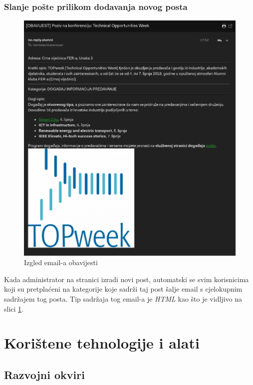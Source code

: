 \documentclass[zavrsni, numeric]{fer}
\begin{document}
\subsection{Slanje pošte prilikom dodavanja novog posta}

\begin{figure}[H]
	\centering
	\includegraphics[width=13cm]{slike/mail.png}
	\caption{Izgled email-a obavijesti} 
	\label{fig:mail}
\end{figure}

Kada administrator na stranici izradi novi post, automatski se svim korisnicima koji su pretplaćeni na kategorije koje sadrži taj post šalje email s cjelokupnim sadržajem tog posta. Tip sadržaja tog email-a je \textit{HTML} kao što je vidljivo na slici \ref{fig:mail}. 

\chapter{Korištene tehnologije i alati}

\section{Razvojni okviri}
\end{document}
